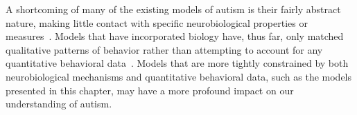 A shortcoming of many of the existing models of autism is their fairly abstract nature, making little contact with specific neurobiological properties or measures~\cite{CohenIL:1994:AutismLearning,McClellandJL:2000:Autism,OLoughlinC:2000:Coherence}. Models that have incorporated biology have, thus far, only matched qualitative patterns of behavior rather than attempting to account for any quantitative behavioral data~\cite{GustafssonL:1997:AutismMaps,RefWorks:146}. Models that are more tightly constrained by both neurobiological mechanisms and quantitative behavioral data, such as the models presented in this chapter, may have a more profound impact on our understanding of autism.
